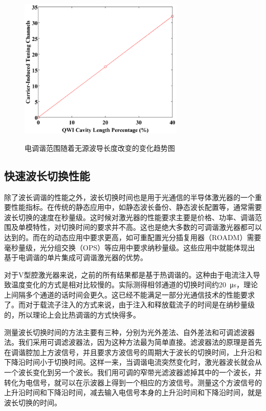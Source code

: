 \documentclass{ZJUthesis}
\begin{document}
\begin{figure}[htbp]
  \centering
  \includegraphics[width=0.7\textwidth]{./Pictures/20p4.eps}\\
  \caption{电调谐范围随着无源波导长度改变的变化趋势图}
  \label{fig_20p4}
\end{figure}

\subsection{快速波长切换性能}

除了波长调谐的性能之外，波长切换时间也是用于光通信的半导体激光器的一个重要性能指标。在传统的静态应用中，如静态波长备份、静态波长配置等，通常需要波长切换的速度在秒量级。这时候对激光器的性能要求主要是价格、功率、调谐范围及单模特性，对切换时间的要求并不高。这也是绝大多数的可调谐激光器都可以达到的。而在的动态应用中要求更高，如可重配置光分插复用器（ROADM）需要毫秒量级，光分组交换（OPS）等应用中要求纳秒量级。这些应用中就能体现出基于电调谐的单片集成可调谐激光器的优势。

对于V型腔激光器来说，之前的所有结果都是基于热调谐的。这种由于电流注入导致温度变化的方式是相对比较慢的。实际测得相邻通道的切换时间约20~μs，理论上间隔多个通道的话时间会更久。这已经不能满足一部分光通信技术的性能要求了。而对于载流子注入的方式来说，由于注入和释放载流子的时间是在纳秒量级的，所以理论上会比热调谐的方式快得多。

测量波长切换时间的方法主要有三种，分别为光外差法\cite{Phelan2008A}\cite{刘铁根2009光电检测技术与系统}、自外差法和可调滤波器法。我们采用可调滤波器法，因为这种方法最为简单直接。滤波器法的原理是首先在调谐腔加上方波信号，并且要求方波信号的周期大于波长的切换时间，上升沿和下降沿时间小于切换时间。这样一来，当调谐电流突然变化时，激光器波长就会从一个波长变化到另一个波长。我们用可调的窄带光滤波器滤掉其中的一个波长，并转化为电信号，就可以在示波器上得到一个相应的方波信号。测量这个方波信号的上升沿时间和下降沿时间，减去输入电信号本身的上升沿时间和下降沿时间，就是波长切换的时间。
\end{document}
